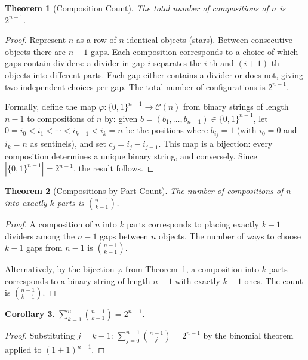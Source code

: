 \documentclass[twocolumn,10pt,a4paper]{article}
\newtheorem{theorem}{Theorem}[section]
\newtheorem{corollary}[theorem]{Corollary}
\theoremstyle{definition}
\theoremstyle{remark}
\begin{document}
\begin{theorem}[Composition Count]
\label{thm:comp_count}
The total number of compositions of $n$ is $2^{n-1}$.
\end{theorem}

\begin{proof}
Represent $n$ as a row of $n$ identical objects (stars). Between consecutive objects there are $n-1$ gaps. Each composition corresponds to a choice of which gaps contain dividers: a divider in gap $i$ separates the $i$-th and $(i+1)$-th objects into different parts. Each gap either contains a divider or does not, giving two independent choices per gap. The total number of configurations is $2^{n-1}$.

Formally, define the map $\varphi: \{0,1\}^{n-1} \to \mathcal{C}(n)$ from binary strings of length $n-1$ to compositions of $n$ by: given $b = (b_1, \ldots, b_{n-1}) \in \{0,1\}^{n-1}$, let $0 = i_0 < i_1 < \cdots < i_{k-1} < i_k = n$ be the positions where $b_{i_j} = 1$ (with $i_0 = 0$ and $i_k = n$ as sentinels), and set $c_j = i_j - i_{j-1}$. This map is a bijection: every composition determines a unique binary string, and conversely. Since $|\{0,1\}^{n-1}| = 2^{n-1}$, the result follows.
\end{proof}

\begin{theorem}[Compositions by Part Count]
\label{thm:comp_parts}
The number of compositions of $n$ into exactly $k$ parts is $\binom{n-1}{k-1}$.
\end{theorem}

\begin{proof}
A composition of $n$ into $k$ parts corresponds to placing exactly $k-1$ dividers among the $n-1$ gaps between $n$ objects. The number of ways to choose $k-1$ gaps from $n-1$ is $\binom{n-1}{k-1}$.

Alternatively, by the bijection $\varphi$ from Theorem~\ref{thm:comp_count}, a composition into $k$ parts corresponds to a binary string of length $n-1$ with exactly $k-1$ ones. The count is $\binom{n-1}{k-1}$.
\end{proof}

\begin{corollary}
\label{cor:sum_binom}
$\sum_{k=1}^{n} \binom{n-1}{k-1} = 2^{n-1}$.
\end{corollary}

\begin{proof}
Substituting $j = k-1$: $\sum_{j=0}^{n-1} \binom{n-1}{j} = 2^{n-1}$ by the binomial theorem applied to $(1+1)^{n-1}$.
\end{proof}
\end{document}
